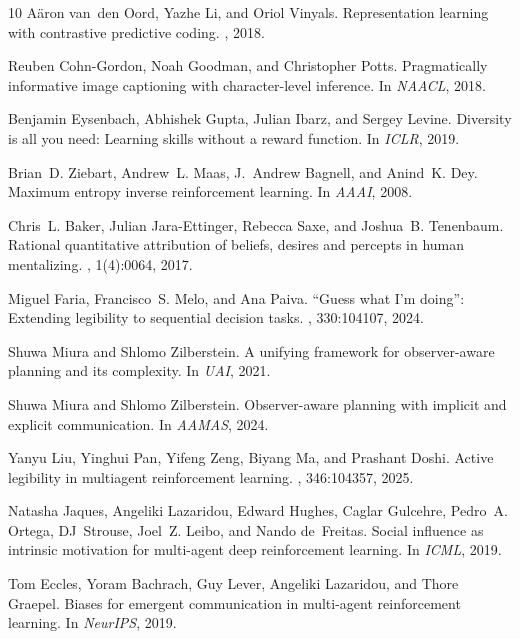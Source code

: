 \documentclass[sigconf,review,anonymous]{acmart}
\begin{document}
\begin{thebibliography}{10}
A{\"a}ron van~den Oord, Yazhe Li, and Oriol Vinyals.
\newblock Representation learning with contrastive predictive coding.
, 2018.

Reuben Cohn-Gordon, Noah Goodman, and Christopher Potts.
\newblock Pragmatically informative image captioning with character-level inference.
\newblock In {\em NAACL}, 2018.

Benjamin Eysenbach, Abhishek Gupta, Julian Ibarz, and Sergey Levine.
\newblock Diversity is all you need: Learning skills without a reward function.
\newblock In {\em ICLR}, 2019.

Brian~D. Ziebart, Andrew~L. Maas, J.~Andrew Bagnell, and Anind~K. Dey.
\newblock Maximum entropy inverse reinforcement learning.
\newblock In {\em AAAI}, 2008.

Chris~L. Baker, Julian Jara-Ettinger, Rebecca Saxe, and Joshua~B. Tenenbaum.
\newblock Rational quantitative attribution of beliefs, desires and percepts in human mentalizing.
, 1(4):0064, 2017.

Miguel Faria, Francisco~S. Melo, and Ana Paiva.
\newblock ``Guess what I'm doing'': Extending legibility to sequential decision tasks.
, 330:104107, 2024.

Shuwa Miura and Shlomo Zilberstein.
\newblock A unifying framework for observer-aware planning and its complexity.
\newblock In {\em UAI}, 2021.

Shuwa Miura and Shlomo Zilberstein.
\newblock Observer-aware planning with implicit and explicit communication.
\newblock In {\em AAMAS}, 2024.

Yanyu Liu, Yinghui Pan, Yifeng Zeng, Biyang Ma, and Prashant Doshi.
\newblock Active legibility in multiagent reinforcement learning.
, 346:104357, 2025.

Natasha Jaques, Angeliki Lazaridou, Edward Hughes, Caglar Gulcehre, Pedro~A. Ortega, DJ~Strouse, Joel~Z. Leibo, and Nando de~Freitas.
\newblock Social influence as intrinsic motivation for multi-agent deep reinforcement learning.
\newblock In {\em ICML}, 2019.

Tom Eccles, Yoram Bachrach, Guy Lever, Angeliki Lazaridou, and Thore Graepel.
\newblock Biases for emergent communication in multi-agent reinforcement learning.
\newblock In {\em NeurIPS}, 2019.


\end{thebibliography}
\end{document}
